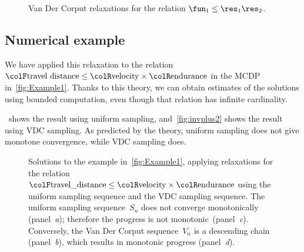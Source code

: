 \begin{figure}[h]
	\centering
	\caption{Van Der Corput relaxations for the relation
		$\fun_{1}\leq\res_{1}\res_{2}$.}
	\label{fig:approx_invmult}
\end{figure}

\subsection{Numerical example}

We have applied this relaxation to the relation ${\colF\text{travel distance}}\leq{\colR\text{velocity}}\times{\colR\text{endurance}}$ in the MCDP in~\cref{fig:Example1}.
Thanks to this theory, we can obtain estimates of the solutions using bounded computation, even though that relation has infinite cardinality.

~shows the result using uniform sampling,
and~\cref{fig:invplus2} shows the result using VDC sampling.
As predicted by the theory, uniform sampling does not give monotone
convergence, while VDC sampling does.
\begin{figure}[t]
	\centering
	\centering

	\caption{Solutions to the example in~\cref{fig:Example1}, applying relaxations
		for the relation ${\colF\text{travel\_distance}}\leq{\colR\text{velocity}}\times{\colR\text{endurance}}$
		using the uniform sampling sequence and the VDC sampling sequence.
		The uniform sampling sequence~$S_{n}$ does not converge monotonically
		(panel~\emph{a}); therefore the progress is not monotonic~(panel\emph{~c}).
		Conversely, the Van Der Corput sequence~$V_{n}$ is a descending
		chain (panel~\emph{b}), which results in monotonic progress (panel~\emph{d}).
	}
\end{figure}

